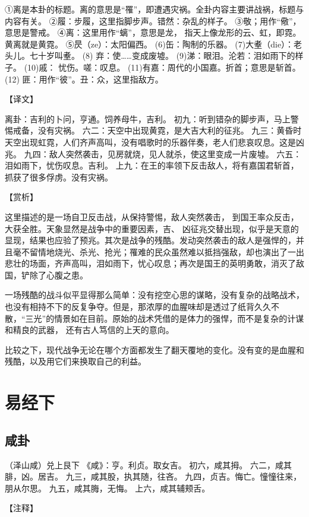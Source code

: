 \documentclass[12pt,UTF8]{ctexbook}
\begin{document}
①离是本卦的标题。离的意思是“罹”，即遭遇灾祸。全卦内容主要讲战祸，标题与内容有关。
②履：步履，这里指脚步声。错然：杂乱的样子。
③敬；用作“儆”，意思是警戒。
④离：这里用作“螭”，意思是龙， 指天上像龙形的云、虹，即霓。黄离就是黄霓。
⑤昃（ze）：太阳偏西。
(6)缶：陶制的乐器。
(7)大耊（die）：老头儿。七十岁叫耊。
(8) 弃：使……变成废墟。
(9)涕：眼泪。沦若：泪如雨下的样子。
(10)戚： 忧伤。嗟：叹息。
(11)有嘉：周代的小国嘉。折首；意思是斩首。
(12) 匪：用作“彼”。丑：众，这里指敌方。

【译文】

离卦：吉利的卜问，亨通。饲养母牛，吉利。
初九：听到错杂的脚步声，马上警惕戒备，没有灾祸。
六二：天空中出现黄霓，是大吉大利的征兆。
九三：黄昏时天空出现虹霓，人们齐声高叫，没有唱歌时的乐器伴奏，老人们悲哀叹息。这是凶兆。
九四：敌人突然袭击，见房就烧，见人就杀，使这里变成一片废墟。
六五：泪如雨下，忧伤叹息。吉利。
上九：在王的率领下反击敌人，将有嘉国君斩首，抓获了很多俘虏。没有灾祸。

【赏析】

这里描述的是一场自卫反击战，从保持警惕，敌人突然袭击， 到国王率众反击，大获全胜。天象显然是战争中的重要因素，吉、 凶征兆交替出现，似乎是天意的显现，结果也应验了预兆。其次是战争的残酷。发动突然袭击的敌人是强悍的，并且毫不留情地烧光、杀光、抢光；罹难的民众虽然难以抵挡强敌，却也演出了一出悲壮的场面，齐声高叫，泪如雨下，忧心叹息；再次是国王的英明勇敢，消灭了敌国，铲除了心腹之患。

一场残酷的战斗似平显得那么简单：没有挖空心思的谋略，没有复杂的战略战术，也没有相持不下的反复争夺。但是，那浓厚的血腥味却是透过了纸背久久不散，“三光”的情景如在目前。原始的战术凭借的是体力的强悍，而不是复杂的计谋和精良的武器， 还有古人笃信的上天的意向。

比较之下，现代战争无论在哪个方面都发生了翻天覆地的变化。没有变的是血腥和残酷，以及用它们来换取自己的利益。

\part{易经下}

\chapter{咸卦}

（泽山咸）兑上艮下
《咸》：亨。利贞。取女吉。
初六，咸其拇。
六二，咸其腓，凶。居吉。
九三，咸其股，执其随，往吝。
九四，贞吉。悔亡。憧憧往来，朋从尔思。
九五，咸其脢，无悔。
上六，咸其辅颊舌。

【注释】
\end{document}
